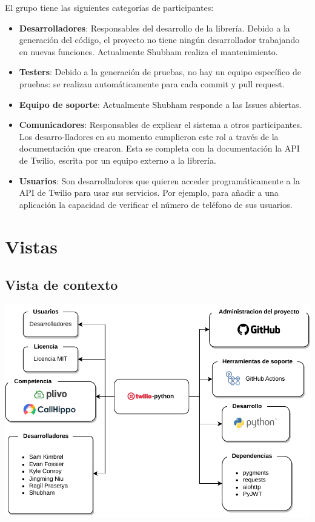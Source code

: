 \documentclass{article}
\begin{document}
El grupo tiene las siguientes categorías de participantes:

\begin{itemize}
  \setlength\itemsep{0em}
  \item \textbf{Desarrolladores}: Responsables del desarrollo
  de la librería. Debido a la generación del código,
  el proyecto no tiene ningún desarrollador trabajando en nuevas funciones.
  Actualmente Shubham realiza el mantenimiento.
  \item \textbf{Testers}: Debido a la generación de pruebas,
  no hay un equipo específico de pruebas:
  se realizan automáticamente para cada commit y pull request.
  \item \textbf{Equipo de soporte}: Actualmente
  Shubham responde a las Issues abiertas.
  \item \textbf{Comunicadores}: Responsables de explicar el sistema
  a otros participantes. Los desarro-lladores en su momento
  cumplieron este rol a través de la documentación que crearon.
  Esta se completa con la documentación la API de Twilio,
  escrita por un equipo externo a la librería.
  \item \textbf{Usuarios}: Son desarrolladores que quieren
  acceder programáticamente a la API de Twilio para usar sus servicios.
  Por ejemplo, para añadir a una aplicación
  la capacidad de verificar el número de teléfono de sus usuarios.
\end{itemize}

\section{Vistas}

\subsection{Vista de contexto}

\hfill

\begin{center}
  \includegraphics[width=\textwidth]{VistaContexto.pdf}
  \label{fig:vista contexto}
\end{center}
\end{document}
